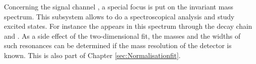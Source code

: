 Concerning the signal channel \LbToDpmunuX, a special focus is put on the invariant \Dz\proton mass spectrum.
This subsystem allows to do a spectroscopical analysis and study excited \Lc states.
For instance the \LcResI appears in this spectrum through the decay chain \decay{\Lb}{\LcResI\mun\neumb} and \decay{\LcResI}{\Dz\proton}.
As a side effect of the two-dimensional fit, the masses and the widths of such resonances can be determined if the mass resolution of the detector is known.
This is also part of Chapter \ref{sec:Normalisationfit}.

